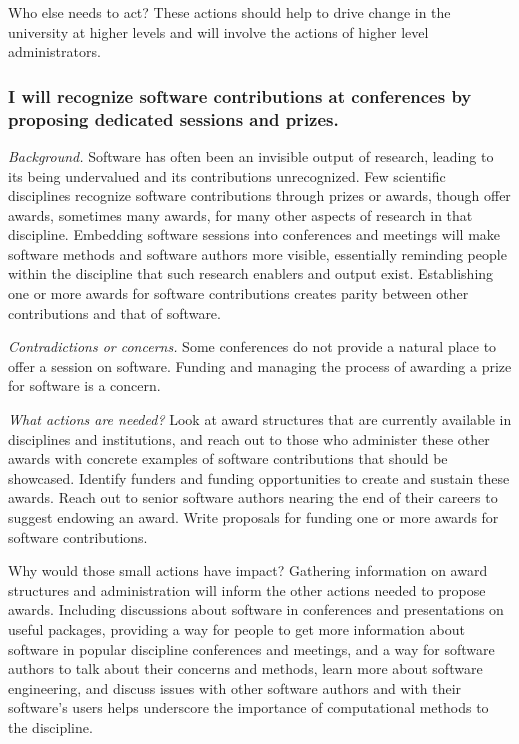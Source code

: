 \documentclass[a4paper,UKenglish]{dagman}
\renewcommand{\paragraph}[1]{\subsubsection*{#1}\xspace}
\begin{document}
Who else needs to act?
These actions should help to drive change in the university at higher levels and will involve the actions of higher level administrators.

\paragraph{I will recognize software contributions at conferences by proposing dedicated sessions and prizes.}

\emph{Background.} Software has often been an invisible output of research, leading to its being undervalued and its contributions unrecognized.
Few scientific disciplines recognize software contributions through prizes or awards, though offer awards, sometimes many awards, for many other aspects of research in that discipline.
Embedding software sessions into conferences and meetings will make software methods and software authors more visible, essentially reminding people within the discipline that such research enablers and output exist.
Establishing one or more awards for software contributions creates parity between other contributions and that of software.

\emph{Contradictions or concerns.} Some conferences do not provide a natural place to offer a session on software. 
Funding and managing the process of awarding a prize for software is a concern. 

\emph{What actions are needed?}
Look at award structures that are currently available in disciplines and institutions, and reach out to those who administer these other awards with concrete examples of software contributions that should be showcased. Identify funders and funding opportunities to create and sustain these awards. Reach out to senior software authors nearing the end of their careers to suggest endowing an award. Write proposals for funding one or more awards for software contributions.

Why would those small actions have impact?
Gathering information on award structures and administration will inform the other actions needed to propose awards.
Including discussions about software in conferences and presentations on useful packages, providing a way for people to get more information about software in popular discipline conferences and meetings, and a way for software authors to talk about their concerns and methods, learn more about software engineering, and discuss issues with other software authors and with their software's users helps underscore the importance of computational methods to the discipline.
\end{document}
